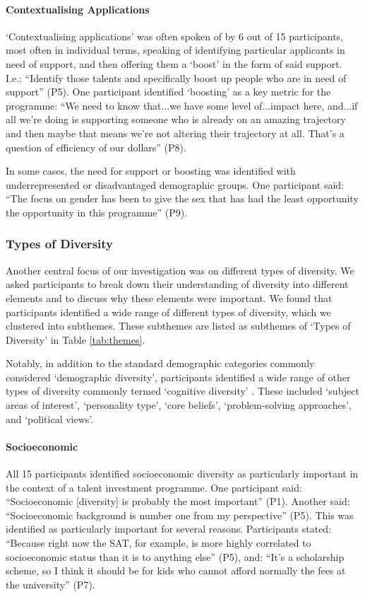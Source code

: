 \paragraph{Contextualising Applications}
`Contextualising applications' was often spoken of by 6 out of 15 participants, most often in individual terms, speaking of identifying particular applicants in need of support, and then offering them a `boost' in the form of said support. I.e.: ``Identify those talents and specifically boost up people who are in need of support'' (P5). One participant identified `boosting' as a key metric for the programme: ``We need to know that...we have some level of...impact here, and...if all we're doing is supporting someone who is already on an amazing trajectory and then maybe that means we're not altering their trajectory at all. That's a question of efficiency of our dollars'' (P8).

In some cases, the need for support or boosting was identified with underrepresented or disadvantaged demographic groups. One participant said: ``The focus on gender has been to give the sex that has had the least opportunity the opportunity in this programme'' (P9).

\subsubsection{Types of Diversity}
Another central focus of our investigation was on different types of diversity. We asked participants to break down their understanding of diversity into different elements and to discuss why these elements were important. We found that participants identified a wide range of different types of diversity, which we clustered into subthemes. These subthemes are listed as subthemes of `Types of Diversity' in Table \ref{tab:themes}.

Notably, in addition to the standard demographic categories commonly considered `demographic diversity', participants identified a wide range of other types of diversity commonly termed `cognitive diversity' \cite{page_diversity_2010}. These included `subject areas of interest', `personality type', `core beliefs', `problem-solving approaches', and `political views'.

\paragraph{Socioeconomic}
All 15 participants identified socioeconomic diversity as particularly important in the context of a talent investment programme. One participant said: ``Socioeconomic [diversity] is probably the most important'' (P1). Another said: ``Socioeconomic background is number one from my perspective'' (P5). This was identified as particularly important for several reasons. Participants stated: ``Because right now the SAT, for example, is more highly correlated to socioeconomic status than it is to anything else'' (P5), and: ``It's a scholarship scheme, so I think it should be for kids who cannot afford normally the fees at the university'' (P7).

